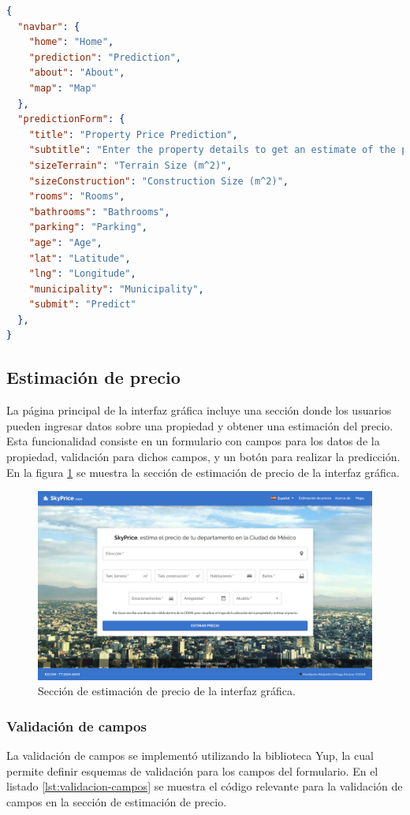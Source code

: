 \begin{lstlisting}[language=json, caption={Archivo de traducción en inglés}, label={lst:ingles}]
{
  "navbar": {
    "home": "Home",
    "prediction": "Prediction",
    "about": "About",
    "map": "Map"
  },
  "predictionForm": {
    "title": "Property Price Prediction",
    "subtitle": "Enter the property details to get an estimate of the price",
    "sizeTerrain": "Terrain Size (m^2)",
    "sizeConstruction": "Construction Size (m^2)",
    "rooms": "Rooms",
    "bathrooms": "Bathrooms",
    "parking": "Parking",
    "age": "Age",
    "lat": "Latitude",
    "lng": "Longitude",
    "municipality": "Municipality",
    "submit": "Predict"
  },
}
\end{lstlisting}

\subsection{Estimación de precio}
La página principal de la interfaz gráfica incluye una sección donde los usuarios
pueden ingresar datos sobre una propiedad y obtener una estimación del precio. Esta
funcionalidad consiste en un formulario con campos para los datos de la propiedad,
validación para dichos campos, y un botón para realizar la predicción. En la figura
\ref{fig:estimacion-precio} se muestra la sección de estimación de precio de la
interfaz gráfica.

\begin{figure}[H]
    \centering
    \includegraphics[width=1.0\textwidth]{imagenes/05-implementacion/interfaz-grafica/formulario-prediccion.png}
    \caption{Sección de estimación de precio de la interfaz gráfica.}
    \label{fig:estimacion-precio}
\end{figure}

\subsubsection{Validación de campos}
La validación de campos se implementó utilizando la biblioteca Yup, la cual permite
definir esquemas de validación para los campos del formulario. En el listado
\ref{lst:validacion-campos} se muestra el código relevante para la validación de
campos en la sección de estimación de precio.

